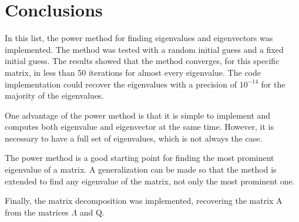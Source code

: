 \section{Conclusions} \label{sec:conclusions}
In this list, the power method for finding eigenvalues and eigenvectors was implemented. The method was tested with a random initial guess and a fixed initial guess. The results showed that the method converges, for this specific matrix, in less than 50 iterations for almost every eigenvalue. The code implementation could recover the eigenvalues with a precision of $10^{-14}$ for the majority of the eigenvalues.

One advantage of the power method is that it is simple to implement and computes both eigenvalue and eigenvector at the same time. However, it is necessary to have a full set of eigenvalues, which is not always the case. 

The power method is a good starting point for finding the most prominent eigenvalue of a matrix. A generalization can be made so that the method is extended to find any eigenvalue of the matrix, not only the most prominent one. 

Finally, the matrix decomposition was implemented, recovering the matrix A from the matrices $\Lambda$ and Q.